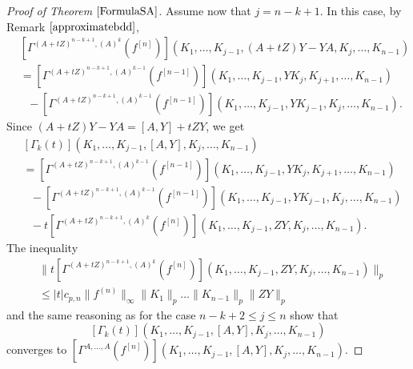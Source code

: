 \documentclass[12pt]{amsart}
\theoremstyle{remark}
\begin{document}
\begin{proof}[Proof of Theorem $\ref{FormulaSA}$]
Assume now that $j=n-k+1$. In this case, by Remark $\ref{approximatebdd}$,
\begin{align*}
& \left[\Gamma^{(A+tZ)^{n-k+1},(A)^k}(f^{[n]}) \right](K_1, \ldots, K_{j-1}, (A+tZ)Y - YA, K_j, \ldots, K_{n-1}) \\
& = \left[\Gamma^{(A+tZ)^{n-k+1},(A)^{k-1}}(f^{[n-1]}) \right](K_1, \ldots, K_{j-1}, YK_j, K_{j+1}, \ldots, K_{n-1}) \\
& \ \ \ - \left[\Gamma^{(A+tZ)^{n-k+1},(A)^{k-1}}(f^{[n-1]}) \right](K_1, \ldots, K_{j-1}, YK_{j-1}, K_j, \ldots, K_{n-1}).
\end{align*}
Since $(A+tZ)Y - YA = [A,Y] +tZY$, we get
\begin{align*}
& \left[\Gamma_k(t)\right](K_1, \ldots, K_{j-1}, [A,Y], K_j, \ldots, K_{n-1}) \\
& = \left[\Gamma^{(A+tZ)^{n-k+1},(A)^{k-1}}(f^{[n-1]}) \right](K_1, \ldots, K_{j-1}, YK_j, K_{j+1}, \ldots, K_{n-1}) \\
& \ \ \ - \left[\Gamma^{(A+tZ)^{n-k+1},(A)^{k-1}}(f^{[n-1]}) \right](K_1, \ldots, K_{j-1}, YK_{j-1}, K_j, \ldots, K_{n-1}) \\
& \ \ \ - t \left[\Gamma^{(A+tZ)^{n-k+1},(A)^k}(f^{[n]}) \right](K_1, \ldots, K_{j-1}, ZY, K_j, \ldots, K_{n-1}).
\end{align*}
The inequality
\begin{align*}
& \| t \left[\Gamma^{(A+tZ)^{n-k+1},(A)^k}(f^{[n]}) \right](K_1, \ldots, K_{j-1}, ZY, K_j, \ldots, K_{n-1}) \|_p \\
& \leq |t| c_{p,n} \|f^{(n)}\|_{\infty} \|K_1\|_p \ldots \|K_{n-1}\|_p \|ZY\|_p
\end{align*}
and the same reasoning as for the case $n-k+2 \leq j \leq n$ show that
$$
\left[\Gamma_k(t)\right](K_1, \ldots, K_{j-1}, [A,Y], K_j, \ldots, K_{n-1})
$$
converges to $\left[\Gamma^{A,\ldots, A}(f^{[n]}) \right](K_1, \ldots, K_{j-1}, [A,Y], K_j, \ldots, K_{n-1})$.


\end{proof}
\end{document}
